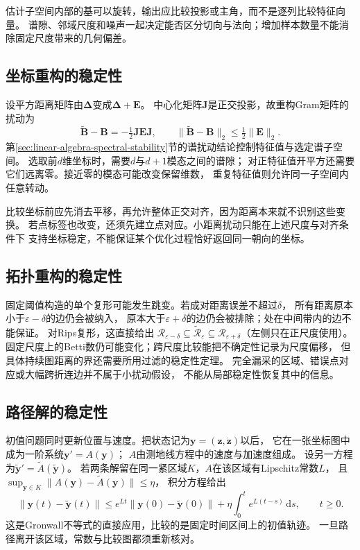 估计子空间内部的基可以旋转，输出应比较投影或主角，而不是逐列比较特征向量。
谱隙、邻域尺度和噪声一起决定能否区分切向与法向；增加样本数量不能消除固定尺度带来的几何偏差。

\subsection{坐标重构的稳定性}
\label{sec:geometry-coordinate-reconstruction-stability}

设平方距离矩阵由$\bm\Delta$变成$\bm\Delta+\bm E$。
中心化矩阵$\bm J$是正交投影，故重构Gram矩阵的扰动为
\[
 \widetilde{\bm B}-\bm B=-\tfrac12\bm J\bm E\bm J,\qquad
 \lVert\widetilde{\bm B}-\bm B\rVert_2\leq\tfrac12\lVert\bm E\rVert_2.
\]
第\ref{sec:linear-algebra-spectral-stability}节的谱扰动结论控制特征值与选定谱子空间。
选取前$d$维坐标时，需要$d$与$d+1$模态之间的谱隙；
对正特征值开平方还需要它们远离零。接近零的模态可能改变保留维数，
重复特征值则允许同一子空间内任意转动。

比较坐标前应先消去平移，再允许整体正交对齐，因为距离本来就不识别这些变换。
若点标签也改变，还须先建立点对应。小距离扰动只能在上述尺度与对齐条件下
支持坐标稳定，不能保证某个优化过程恰好返回同一朝向的坐标。

\subsection{拓扑重构的稳定性}
\label{sec:geometry-topology-reconstruction-stability}

固定阈值构造的单个复形可能发生跳变。若成对距离误差不超过$\delta$，
所有距离原本小于$\varepsilon-\delta$的边仍会被纳入，
原本大于$\varepsilon+\delta$的边仍会被排除；处在中间带内的边不能保证。
对Rips复形，这直接给出
$\mathcal R_{\varepsilon-\delta}\subseteq\widetilde{\mathcal R}_{\varepsilon}
\subseteq\mathcal R_{\varepsilon+\delta}$（左侧只在正尺度使用）。
固定尺度上的Betti数仍可能变化；跨尺度比较能把不确定性记录为尺度偏移，
但具体持续图距离的界还需要所用过滤的稳定性定理。
完全漏采的区域、错误点对应或大幅跨折连边并不属于小扰动假设，
不能从局部稳定性恢复其中的信息。

\subsection{路径解的稳定性}
\label{sec:geometry-path-solution-stability}

初值问题同时更新位置与速度。把状态记为$\bm y=(\bm z,\dot{\bm z})$以后，
它在一张坐标图中成为一阶系统$\bm y'=A(\bm y)$；
$A$由测地线方程中的速度与加速度组成。
设另一方程为$\widetilde{\bm y}'=\widetilde A(\widetilde{\bm y})$。
若两条解留在同一紧区域$K$，$A$在该区域有Lipschitz常数$L$，
且$\sup_{\bm y\in K}\lVert A(\bm y)-\widetilde A(\bm y)\rVert\leq\eta$，
积分方程给出
\[
 \lVert \bm y(t)-\widetilde{\bm y}(t)\rVert
 \leq e^{Lt}\lVert \bm y(0)-\widetilde{\bm y}(0)\rVert
       +\eta\int_0^t e^{L(t-s)}\,\mathrm ds,\qquad t\geq0.
\]
这是Gronwall不等式的直接应用，比较的是固定时间区间上的初值轨迹。
一旦路径离开该区域，常数与比较图都须重新核对。

